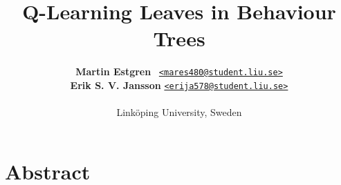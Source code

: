 \documentclass[a4paper, twocolumn]{article}
\title{\textbf{Q-Learning Leaves in Behaviour Trees}}
\author{{\textbf{Martin Estgren}} \;\;\;\;\;\;\;\;\;\, {\href{mailto:mares480@student.liu.se}
                                                       {\texttt{<mares480@student.liu.se>}}} \\
        {\textbf{Erik S. V. Jansson}} \;\;\;\;         {\href{mailto:erija578@student.liu.se}
                                                       {\texttt{<erija578@student.liu.se>}}} \\~\\
        {Linköping University, Sweden}\vspace{-2.0ex}}
\begin{document}
    \maketitle
    \section*{Abstract}


    \tableofcontents \newpage


    \newpage %
    \nocite{*} %
    
    
\end{document}
